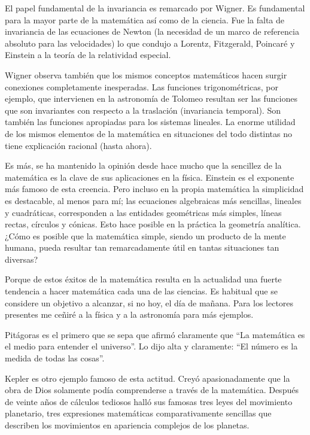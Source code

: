\documentclass[a4paper, 12pt]{article}
\begin{document}
El papel fundamental de la invariancia es remarcado por Wigner. Es fundamental para la mayor parte de la matemática así como de la ciencia. Fue la falta de invariancia de las ecuaciones de Newton (la necesidad de un marco de referencia absoluto para las velocidades) lo que condujo a Lorentz, Fitzgerald, Poincaré y Einstein a la teoría de la relatividad especial.

 

Wigner observa también que los mismos conceptos matemáticos hacen surgir conexiones completamente inesperadas. Las funciones trigonomé\-tricas, por ejemplo, que intervienen en la astronomía de Tolomeo resultan ser las funciones que son invariantes con respecto a la traslación (invariancia temporal). Son también las funciones apropiadas para los sistemas lineales. La enorme utilidad de los mismos elementos de la matemática en situaciones del todo distintas no tiene explicación racional (hasta ahora).

 

Es más, se ha mantenido la opinión desde hace mucho que la sencillez de la matemática es la clave de sus aplicaciones en la física. Einstein es el exponente más famoso de esta creencia. Pero incluso en la propia matemática la simplicidad es destacable, al menos para mí; las ecuaciones algebraicas más sencillas, lineales y cuadráticas, corresponden a las entidades geométricas más simples, líneas rectas, círculos y cónicas. Esto hace posible en la práctica la geometría analítica. ¿Cómo es posible que la matemática simple, siendo un producto de la mente humana, pueda resultar tan remarcadamente útil en tantas situaciones tan diversas?

 

Porque de estos éxitos de la matemática resulta en la actualidad una fuerte tendencia a hacer matemática cada una de las ciencias. Es habitual que se considere un objetivo a alcanzar, si no hoy, el día de mañana. Para los lectores presentes me ceñiré a la física y a la astronomía para más ejemplos.

 

Pitágoras es el primero que se sepa que afirmó claramente que ``La matemática es el medio para entender el universo''. Lo  dijo alta y claramente: ``El número es la medida de todas las cosas''.

 

Kepler es otro ejemplo famoso de esta actitud. Creyó apasionadamente que la obra de Dios solamente podía comprenderse a través de la matemática. Después de veinte años de cálculos tediosos halló sus famosas tres leyes del movimiento planetario, tres expresiones matemáticas comparativamente sencillas que describen los movimientos en apariencia complejos de los planetas.
\end{document}
